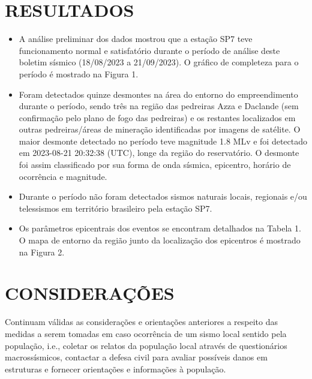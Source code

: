 \section{RESULTADOS}
\label{sec:resultados}
\begin{itemize}
	\item A análise preliminar dos dados mostrou que a estação SP7 teve funcionamento normal e satisfatório durante o período de análise deste boletim sísmico (18/08/2023 a 21/09/2023). O gráfico de completeza para o período é mostrado na Figura 1. 
    \item Foram detectados quinze desmontes na área do entorno do empreendimento durante o período, sendo três na região das pedreiras Azza e Daclande (sem confirmação pelo plano de fogo das pedreiras) e os restantes localizados em outras pedreiras/áreas de mineração identificadas por imagens de satélite. O maior desmonte detectado no período teve magnitude 1.8 MLv e foi detectado em 2023-08-21 20:32:38 (UTC), longe da região do reservatório. O desmonte foi assim classificado por sua forma de onda sísmica, epicentro, horário de ocorrência e magnitude. 
    \item Durante o período não foram detectados sismos naturais locais, regionais e/ou telessismos em território brasileiro pela estação SP7. 
    \item Os parâmetros epicentrais dos eventos se encontram detalhados na Tabela 1. O mapa de entorno da região junto da localização dos epicentros é mostrado na Figura 2. 
\end{itemize}
    

\section{CONSIDERAÇÕES}
\label{sec:consideracoes}
Continuam válidas as considerações e orientações anteriores a respeito das medidas a serem tomadas em caso ocorrência de um sismo local sentido pela população, i.e., coletar os relatos da população local através de questionários macrossísmicos, contactar a defesa civil para avaliar possíveis danos em estruturas e fornecer orientações e informações à população. 

\assinaturaLucas
\clearpage
\newpage
